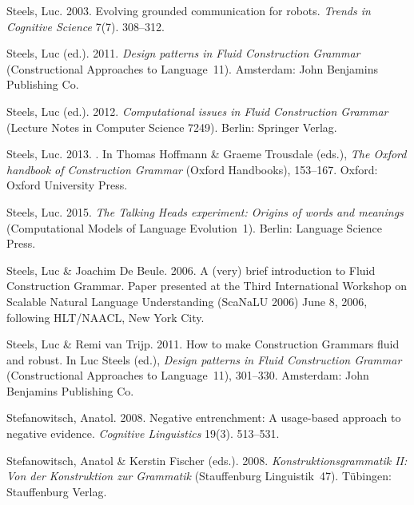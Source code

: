 \begin{thebibliography}{1420}
Steels, Luc. 2003.
\newblock Evolving grounded communication for robots.
\newblock \emph{Trends in Cognitive Science} 7(7). 308--312.

Steels, Luc (ed.). 2011.
\newblock \emph{Design patterns in {Fluid Construction Grammar}}
  (Constructional Approaches to Language~11).
\newblock Amsterdam: John Benjamins Publishing Co.

Steels, Luc (ed.). 2012.
\newblock \emph{Computational issues in {Fluid Construction Grammar}} (Lecture
  Notes in Computer Science 7249).
\newblock Berlin: Springer Verlag.

Steels, Luc. 2013.
.
\newblock In Thomas Hoffmann \& Graeme Trousdale (eds.), \emph{The {Oxford}
  handbook of {Construction Grammar}}  (Oxford Handbooks), 153--167. Oxford:
  Oxford University Press.

Steels, Luc. 2015.
\newblock \emph{The {Talking Heads} experiment: {Origins} of words and
  meanings} (Computational Models of Language Evolution~1).
\newblock Berlin: Language Science Press.

Steels, Luc \& Joachim {De Beule}. 2006.
\newblock A (very) brief introduction to {Fluid Construction Grammar}.
\newblock Paper presented at the Third International Workshop on Scalable
  Natural Language Understanding (ScaNaLU 2006) June 8, 2006, following
  HLT/NAACL, New York City.

Steels, Luc \& Remi {van Trijp}. 2011.
\newblock How to make {Construction Grammars} fluid and robust.
\newblock In Luc Steels (ed.), \emph{Design patterns in {Fluid Construction
  Grammar}} (Constructional Approaches to Language~11), 301--330. Amsterdam:
  John Benjamins Publishing Co.

Stefanowitsch, Anatol. 2008.
\newblock Negative entrenchment: {A} usage-based approach to negative evidence.
\newblock \emph{Cognitive Linguistics} 19(3). 513--531.

Stefanowitsch, Anatol \& Kerstin Fischer (eds.). 2008.
\newblock \emph{{Konstruktionsgrammatik II: Von der Konstruktion zur
  Grammatik}} (Stauffenburg Linguistik~47).
\newblock T{\"u}bingen: Stauffenburg Verlag.


\end{thebibliography}
